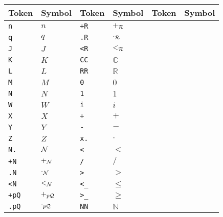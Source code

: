 {\samepage
\begin{center}
\begin{tabular}
{|l|lr||l|lr||l|lr|}
\hline
{\small Token}&\multicolumn{2}{l||}{\small Symbol}&
{\small Token}&\multicolumn{2}{l||}{\small Symbol}&
{\small Token}&\multicolumn{2}{l|}{\small Symbol}\\
 \hline \hline
\verb$n$&\multicolumn{2}{l||}{$n$}&
\verb$+R$&\multicolumn{2}{l||}{$+_{\cal R}$}&
 & &\\ \hline
\verb$q$&\multicolumn{2}{l||}{$q$}&
\verb$.R$&\multicolumn{2}{l||}{$\cdot_{\cal R}$}&
 & &\\ \hline
\verb$J$&\multicolumn{2}{l||}{$J$}&
\verb$<R$&\multicolumn{2}{l||}{$<_{\cal R}$}&
 & &\\ \hline
\verb$K$&\multicolumn{2}{l||}{$K$}&
\verb$CC$&\multicolumn{2}{l||}{$\mathbb{C}$}&
 & &\\ \hline
\verb$L$&\multicolumn{2}{l||}{$L$}&
\verb$RR$&\multicolumn{2}{l||}{$\mathbb{R}$}&
 & &\\ \hline
\verb$M$&\multicolumn{2}{l||}{$M$}&
\verb$0$&\multicolumn{2}{l||}{$0$}&
 & &\\ \hline
\verb$N$&\multicolumn{2}{l||}{$N$}&
\verb$1$&\multicolumn{2}{l||}{$1$}&
 & &\\ \hline
\verb$W$&\multicolumn{2}{l||}{$W$}&
\verb$i$&\multicolumn{2}{l||}{$i$}&
 & &\\ \hline
\verb$X$&\multicolumn{2}{l||}{$X$}&
\verb$+$&\multicolumn{2}{l||}{$+$}&
 & &\\ \hline
\verb$Y$&\multicolumn{2}{l||}{$Y$}&
\verb$-$&\multicolumn{2}{l||}{$-$}&
 & &\\ \hline
\verb$Z$&\multicolumn{2}{l||}{$Z$}&
\verb$x.$&\multicolumn{2}{l||}{$\cdot$}&
 & &\\ \hline
\verb$N.$&\multicolumn{2}{l||}{${\cal N}$}&
\verb$<$&\multicolumn{2}{l||}{$<$}&
 & &\\ \hline
\verb$+N$&\multicolumn{2}{l||}{$+_{\cal N}$}&
\verb$/$&\multicolumn{2}{l||}{$/$}&
 & &\\ \hline
\verb$.N$&\multicolumn{2}{l||}{$\cdot_{\cal N}$}&
\verb$>$&\multicolumn{2}{l||}{$>$}&
 & &\\ \hline
\verb$<N$&\multicolumn{2}{l||}{$<_{\cal N}$}&
\verb$<_$&\multicolumn{2}{l||}{$\le$}&
 & &\\ \hline
\verb$+pQ$&\multicolumn{2}{l||}{$+_{p{\cal Q}}$}&
\verb$>_$&\multicolumn{2}{l||}{$\ge$}&
 & &\\ \hline
\verb$.pQ$&\multicolumn{2}{l||}{$\cdot_{p{\cal Q}}$}&
\verb$NN$&\multicolumn{2}{l||}{$\mathbb{N}$}&
 & &\\ \hline

\end{tabular}
\end{center}}
